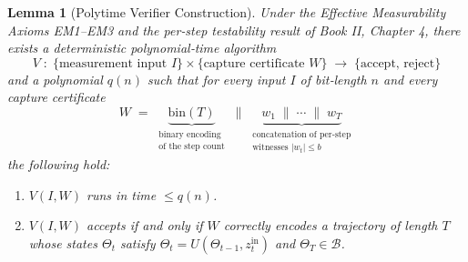 \documentclass[12pt]{article}
\theoremstyle{definition}
\theoremstyle{plain}
\newtheorem{lemma}{Lemma}[section]
\begin{document}
\begin{lemma}[Polytime Verifier Construction]
\label{lem:polytime_verifier}
Under the Effective Measurability Axioms EM1–EM3 and the per‑step testability result of Book II, Chapter 4, there exists a deterministic polynomial‑time algorithm 
\[
  V\;:\;\{\text{measurement input }I\}\times\{\text{capture certificate }W\}\;\to\;\{\text{accept, reject}\}
\]
and a polynomial \(q(n)\) such that for every input \(I\) of bit‑length \(n\) and every capture certificate
\[
  W \;=\; \underbrace{\mathrm{bin}(T)}_{\substack{\text{binary encoding}\\\text{of the step count}}}
         \;\|\;
         \underbrace{w_1\;\|\;\cdots\;\|\;w_T}_{\substack{\text{concatenation of per‑step}\\\text{witnesses }|w_t|\le b}}
\]
the following hold:
\begin{enumerate}
  \item \(V(I,W)\) runs in time \(\le q(n)\).
  \item \(V(I,W)\) accepts if and only if \(W\) correctly encodes a trajectory of length \(T\)
        whose states \(\Theta_t\) satisfy \(\Theta_{t} = U(\Theta_{t-1},z^{\mathrm{in}}_{t})\)
        and \(\Theta_T\in\mathcal B\).
\end{enumerate}
\end{lemma}
\end{document}
